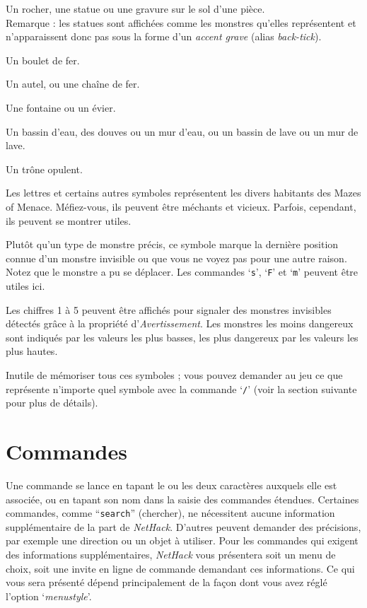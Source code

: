\documentclass[titlepage]{article}
\begin{document}
\begin{description}[font=\mdseries\ttfamily]
\item[\textasciigrave]
Un rocher, une statue ou une gravure sur le sol d'une pièce.\\
Remarque : les statues sont affichées comme les monstres qu'elles représentent
et n'apparaissent donc pas sous la forme d'un \textit{accent grave} (alias \textit{back-tick}).
\item[0]
Un boulet de fer.
\item[\textunderscore]
Un autel, ou une chaîne de fer.
\item[\textbraceleft]
Une fontaine ou un évier.
\item[\textbraceright]
Un bassin d'eau, des douves ou un mur d'eau,
ou un bassin de lave ou un mur de lave.
\item[\textbackslash]
Un trône opulent.
\item[a-z \textrm{\textmd{et}}]
\item[A-HJ-Z \textrm{\textmd{et}}]
\item[@\&\textquotesingle :;]
Les lettres et certains autres symboles représentent les divers habitants
des Mazes of Menace.
Méfiez-vous, ils peuvent être méchants et vicieux.
Parfois, cependant, ils peuvent se montrer utiles.
\item[I]
Plutôt qu'un type de monstre précis, ce symbole marque la dernière position
connue d'un monstre invisible ou que vous ne voyez pas pour une autre raison.
Notez que le monstre a pu se déplacer.
Les commandes `\texttt{s}', `\texttt{F}' et `\texttt{m}' peuvent être utiles ici.
\item[1-5]
Les chiffres 1 à 5 peuvent être affichés pour signaler des monstres invisibles
détectés grâce à la propriété d'\textit{Avertissement}.
Les monstres les moins dangereux sont indiqués par les valeurs les plus basses,
les plus dangereux par les valeurs les plus hautes.

\end{description}
Inutile de mémoriser tous ces symboles ; vous pouvez demander au jeu ce que
représente n'importe quel symbole avec la commande `\texttt{/}' (voir la section
suivante pour plus de détails).

\section{Commandes}

Une commande se lance en tapant le ou les deux caractères auxquels
elle est associée, ou en tapant son nom dans la saisie des commandes
étendues.  Certaines commandes,
comme ``\texttt{search}'' (chercher), ne nécessitent aucune information supplémentaire
de la part de \textit{NetHack}.  D'autres peuvent demander des précisions, par
exemple une direction ou un objet à utiliser.  Pour les commandes qui
exigent des informations supplémentaires, \textit{NetHack} vous présentera soit
un menu de choix, soit une invite en ligne de commande demandant ces informations.
Ce qui vous sera présenté dépend principalement de la façon dont vous avez
réglé l'option `\textit{menustyle}'.
\end{document}
